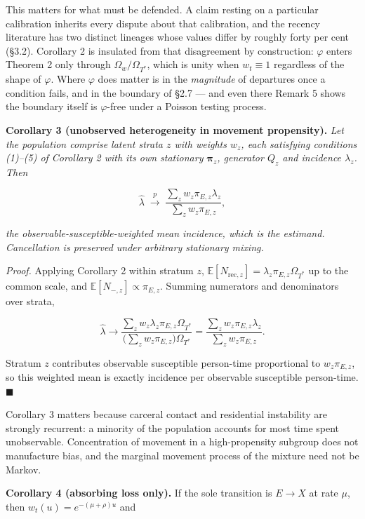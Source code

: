 This matters for what must be defended. A claim resting on a particular calibration inherits every dispute about that calibration, and the recency literature has two distinct lineages whose values differ by roughly forty per cent (§3.2). Corollary 2 is insulated from that disagreement by construction: \(\varphi\) enters Theorem 2 only through \(\Omega_w/\Omega_{T^*}\), which is unity when \(w_t\equiv1\) regardless of the shape of \(\varphi\). Where \(\varphi\) does matter is in the \emph{magnitude} of departures once a condition fails, and in the boundary of §2.7 --- and even there Remark 5 shows the boundary itself is \(\varphi\)-free under a Poisson testing process.

\textbf{Corollary 3 (unobserved heterogeneity in movement propensity).} \emph{Let the population comprise latent strata \(z\) with weights \(w_z\), each satisfying conditions (1)--(5) of Corollary 2 with its own stationary \(\boldsymbol\pi_z\), generator \(Q_z\) and incidence \(\lambda_z\). Then}

\[
\hat\lambda \;\xrightarrow{\;p\;}\; \frac{\sum_z w_z\pi_{E,z}\lambda_z}{\sum_z w_z\pi_{E,z}},
\]

\emph{the observable-susceptible-weighted mean incidence, which is the estimand. Cancellation is preserved under arbitrary stationary mixing.}

\emph{Proof.} Applying Corollary 2 within stratum \(z\), \(\mathbb{E}[N_{\mathrm{rec},z}]=\lambda_z\pi_{E,z}\Omega_{T^*}\) up to the common scale, and \(\mathbb{E}[N_{-,z}]\propto\pi_{E,z}\). Summing numerators and denominators over strata,

\[
\hat\lambda\to\frac{\sum_z w_z\lambda_z\pi_{E,z}\Omega_{T^*}}{\big(\sum_z w_z\pi_{E,z}\big)\Omega_{T^*}}
=\frac{\sum_z w_z\pi_{E,z}\lambda_z}{\sum_z w_z\pi_{E,z}} .
\]

Stratum \(z\) contributes observable susceptible person-time proportional to \(w_z\pi_{E,z}\), so this weighted mean is exactly incidence per observable susceptible person-time. \(\blacksquare\)

Corollary 3 matters because carceral contact and residential instability are strongly recurrent: a minority of the population accounts for most time spent unobservable. Concentration of movement in a high-propensity subgroup does not manufacture bias, and the marginal movement process of the mixture need not be Markov.

\textbf{Corollary 4 (absorbing loss only).} If the sole transition is \(E\to X\) at rate \(\mu\), then \(w_t(u)=e^{-(\mu+\rho)u}\) and


